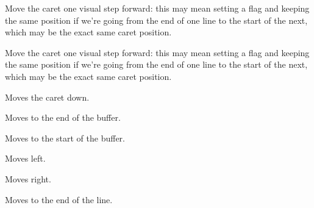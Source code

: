 
Move the caret one visual step forward: this may mean setting a flag
and keeping the same position if we're going from the end of one line
to the start of the next, which may be the exact same caret position.

\label{wxrichtextctrlmovecaretforward}


Move the caret one visual step forward: this may mean setting a flag
and keeping the same position if we're going from the end of one line
to the start of the next, which may be the exact same caret position.

\label{wxrichtextctrlmovedown}


Moves the caret down.

\label{wxrichtextctrlmoveend}


Moves to the end of the buffer.

\label{wxrichtextctrlmovehome}


Moves to the start of the buffer.

\label{wxrichtextctrlmoveleft}


Moves left.

\label{wxrichtextctrlmoveright}


Moves right.

\label{wxrichtextctrlmovetolineend}


Moves to the end of the line.

\label{wxrichtextctrlmovetolinestart}

